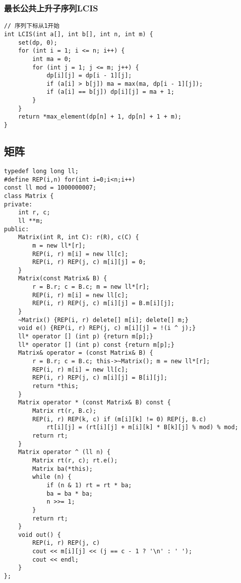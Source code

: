 \documentclass[a4paper]{article}
\begin{document}
\subsubsection{最长公共上升子序列LCIS}
\begin{lstlisting}
// 序列下标从1开始
int LCIS(int a[], int b[], int n, int m) {
	set(dp, 0);
	for (int i = 1; i <= n; i++) {
		int ma = 0;
		for (int j = 1; j <= m; j++) {
			dp[i][j] = dp[i - 1][j];
			if (a[i] > b[j]) ma = max(ma, dp[i - 1][j]);
			if (a[i] == b[j]) dp[i][j] = ma + 1;
		}
	}
	return *max_element(dp[n] + 1, dp[n] + 1 + m);
}
\end{lstlisting}
\subsection{矩阵}
\begin{lstlisting}
typedef long long ll;
#define REP(i,n) for(int i=0;i<n;i++)
const ll mod = 1000000007;
class Matrix {
private:
	int r, c;
	ll **m;
public:
	Matrix(int R, int C): r(R), c(C) {
		m = new ll*[r];
		REP(i, r) m[i] = new ll[c];
		REP(i, r) REP(j, c) m[i][j] = 0;
	}
	Matrix(const Matrix& B) {
		r = B.r; c = B.c; m = new ll*[r];
		REP(i, r) m[i] = new ll[c];
		REP(i, r) REP(j, c) m[i][j] = B.m[i][j];
	}
	~Matrix() {REP(i, r) delete[] m[i]; delete[] m;}
	void e() {REP(i, r) REP(j, c) m[i][j] = !(i ^ j);}
	ll* operator [] (int p) {return m[p];}
	ll* operator [] (int p) const {return m[p];}
	Matrix& operator = (const Matrix& B) {
		r = B.r; c = B.c; this->~Matrix(); m = new ll*[r];
		REP(i, r) m[i] = new ll[c];
		REP(i, r) REP(j, c) m[i][j] = B[i][j];
		return *this;
	}
	Matrix operator * (const Matrix& B) const {
		Matrix rt(r, B.c);
		REP(i, r) REP(k, c) if (m[i][k] != 0) REP(j, B.c)
			rt[i][j] = (rt[i][j] + m[i][k] * B[k][j] % mod) % mod;
		return rt;
	}
	Matrix operator ^ (ll n) {
		Matrix rt(r, c); rt.e();
		Matrix ba(*this);
		while (n) {
			if (n & 1) rt = rt * ba;
			ba = ba * ba;
			n >>= 1;
		}
		return rt;
	}
	void out() {
		REP(i, r) REP(j, c)
		cout << m[i][j] << (j == c - 1 ? '\n' : ' ');
		cout << endl;
	}
};
\end{lstlisting}
\end{document}
